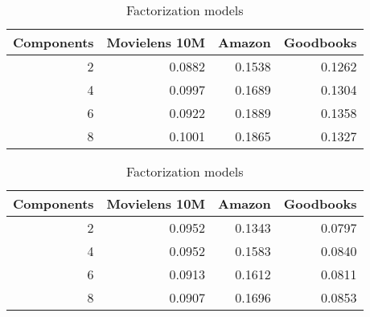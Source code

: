 \begin{table}
\caption{Effect of number of mixture components}
\label{tab:nummixtures}
\begin{subtable}{\columnwidth}
\caption{Sequence models}
\begin{tabularx}{\columnwidth}{rrrr}
\toprule
   Components &   Movielens 10M &   Amazon &   Goodbooks \\
\midrule
            2 &          0.0882 &   0.1538 &      0.1262 \\
            4 &          0.0997 &   0.1689 &      0.1304 \\
            6 &          0.0922 &   0.1889 &      0.1358 \\
            8 &          0.1001 &   0.1865 &      0.1327 \\
\bottomrule
\end{tabularx}
\end{subtable}
\hspace{\fill}
\begin{subtable}{\columnwidth}
\caption{Factorization models}
\begin{tabularx}{\columnwidth}{rrrr}
\toprule
   Components &   Movielens 10M &   Amazon &   Goodbooks \\
\midrule
            2 &          0.0952 &   0.1343 &      0.0797 \\
            4 &          0.0952 &   0.1583 &      0.0840 \\
            6 &          0.0913 &   0.1612 &      0.0811 \\
            8 &          0.0907 &   0.1696 &      0.0853 \\
\bottomrule
\end{tabularx}
\end{subtable}\end{table}